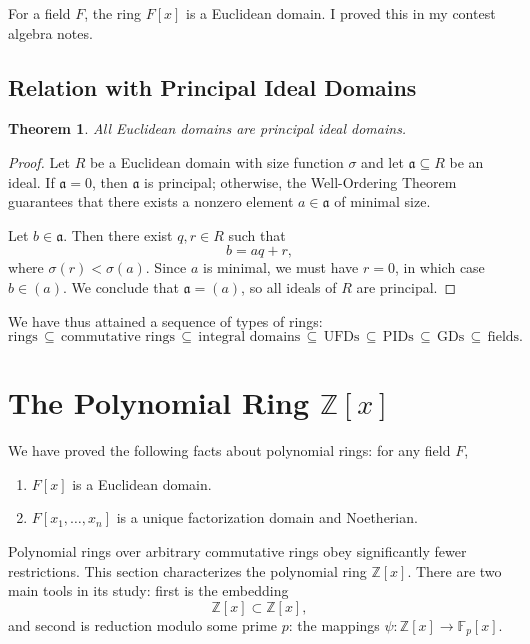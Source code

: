 \documentclass[11pt]{article}
\newtheorem{theorem}{Theorem}
\begin{document}
For a field $F$, the ring $F[x]$ is a Euclidean domain. I proved this in my contest algebra notes.


\subsection{Relation with Principal Ideal Domains}

\begin{adjustwidth}{0.5cm}{}
  \begin{theorem}
    All Euclidean domains are principal ideal domains.
  \end{theorem}
  \begin{proof}
    Let $R$ be a Euclidean domain with size function $\sigma$ and let $\mathfrak{a} \subseteq R$ be an ideal. If $\mathfrak{a} = 0$, then $\mathfrak{a}$ is principal; otherwise, the Well-Ordering Theorem guarantees that there exists a nonzero element $a \in \mathfrak{a}$ of minimal size.

    Let $b \in \mathfrak{a}$. Then there exist $q, r \in R$ such that
    \[
      b = aq + r,
    \]
    where $\sigma(r) < \sigma(a)$. Since $a$ is minimal, we must have $r = 0$, in which case $b \in (a)$. We conclude that $\mathfrak{a} = (a)$, so all ideals of $R$ are principal.
  \end{proof}
\end{adjustwidth}

We have thus attained a sequence of types of rings:
\[
  \text{rings} \, \subseteq \, \text{commutative rings} \, \subseteq \, \text{integral domains} \, \subseteq \, \text{UFDs} \, \subseteq \, \text{PIDs} \, \subseteq \, \text{GDs} \, \subseteq \, \text{fields}.
\]


\section{The Polynomial Ring \texorpdfstring{$\mathbb{Z}[x]$}{Z[x]}}

We have proved the following facts about polynomial rings: for any field $F$,
\begin{enumerate}
  \item $F[x]$ is a Euclidean domain.
  \item $F[x_{1}, \ldots, x_{n}]$ is a unique factorization domain and Noetherian.
\end{enumerate}
Polynomial rings over arbitrary commutative rings obey significantly fewer restrictions. This section characterizes the polynomial ring $\mathbb{Z}[x]$. There are two main tools in its study: first is the embedding
\[
  \mathbb{Z}[x] \subset \mathbb{Z}[x],
\]
and second is reduction modulo some prime $p$: the mappings $\psi : \mathbb{Z}[x] \to \mathbb{F}_{p}[x]$.
\end{document}
